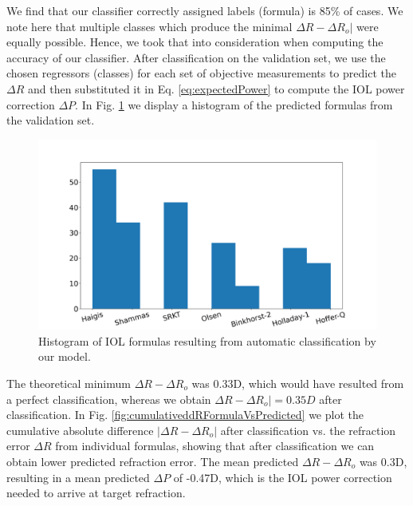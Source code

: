 \documentclass[article,twocolumn,preprint,10pt]{paper}%
\renewcommand{\(}{\left(}
\renewcommand{\)}{\right)}
\renewcommand{\[}{\left[}
\renewcommand{\]}{\right]}
\newcommand{\1}{\mbox{\boldmath$1$}}
\begin{document}
We find that  our classifier correctly assigned labels (formula) is 85\% of cases. We note here that multiple classes which produce the minimal $\Delta R-\Delta R_o|$ were equally possible. Hence, we took that into consideration when computing the accuracy of our classifier. 
After classification on the validation set, we use the chosen regressors (classes) for each set of objective measurements to predict the $\Delta R$ and then substituted it in Eq. \ref{eq:expectedPower} to compute the IOL power correction $\Delta P$. 
In Fig. \ref{fig:HistogramOfChosenFormulas} we display a histogram of the predicted formulas from  the validation set.
\begin{figure}
	\includegraphics[width=1.1\linewidth]{HistogramOfChosenformulaAfterClassification}
	\caption{Histogram of IOL formulas resulting from automatic classification by our model.}
	\label{fig:HistogramOfChosenFormulas}
\end{figure}
The  theoretical minimum $\Delta R-\Delta R_o$ was 0.33D, which would have resulted from a perfect classification, whereas we obtain $\Delta R-\Delta R_o|=0.35D$ after classification. 
In Fig. \ref{fig:cumulativeddRFormulaVsPredicted} we plot the cumulative absolute difference  $|\Delta R - \Delta R_o|$ after classification vs. the refraction error $\Delta R$ from individual formulas, showing that after classification we can obtain lower predicted refraction error.
The mean predicted $\Delta R-\Delta R_o$ was 0.3D, resulting in a mean predicted $\Delta P$ of -0.47D, which is the IOL power correction needed to arrive at target refraction. 
\end{document}
